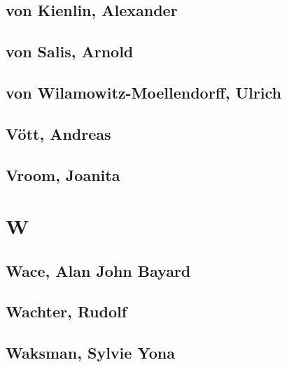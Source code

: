 \subsection[von Kienlin, Alexander (1)]{von Kienlin, Alexander}

\subsection[von Salis, Arnold (2)]{von Salis, Arnold}


\subsection[von Wilamowitz-Moellendorff, Ulrich (1)]{von Wilamowitz-Moellendorff, Ulrich}

\subsection[Vött, Andreas (2)]{Vött, Andreas}


\subsection[Vroom, Joanita (1)]{Vroom, Joanita}

\section{W}

\subsection[Wace, Alan John Bayard (1)]{Wace, Alan John Bayard}

\subsection[Wachter, Rudolf (1)]{Wachter, Rudolf}

\subsection[Waksman, Sylvie Yona (2)]{Waksman, Sylvie Yona}

